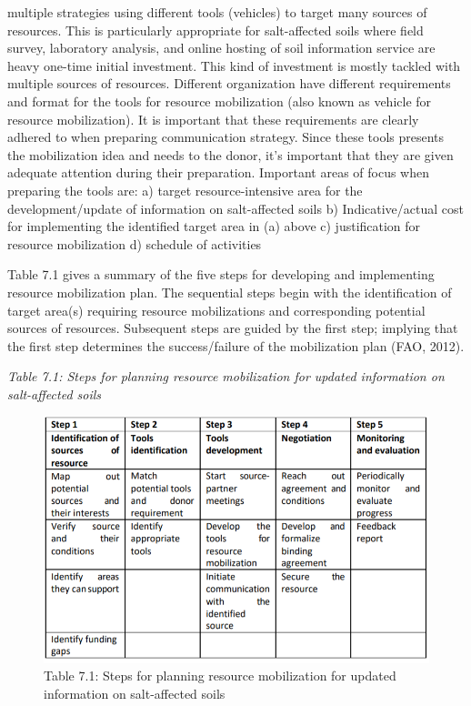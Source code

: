 \documentclass[
  10pt,
  b5paper,
]{book}
\begin{document}
multiple strategies using different tools (vehicles) to target many sources of resources. This is particularly appropriate for salt-affected soils where field survey, laboratory analysis, and online hosting of soil information service are heavy one-time initial investment. This kind of investment is mostly tackled with multiple sources of resources.
Different organization have different requirements and format for the tools for resource mobilization (also known as vehicle for resource mobilization). It is important that these requirements are clearly adhered to when preparing communication strategy. Since these tools presents the mobilization idea and needs to the donor, it's important that they are given adequate attention during their preparation. Important areas of focus when preparing the tools are:
a) target resource-intensive area for the development/update of information on salt-affected soils
b) Indicative/actual cost for implementing the identified target area in (a) above
c) justification for resource mobilization
d) schedule of activities

Table 7.1 gives a summary of the five steps for developing and implementing resource mobilization plan. The sequential steps begin with the identification of target area(s) requiring resource mobilizations and corresponding potential sources of resources. Subsequent steps are guided by the first step; implying that the first step determines the success/failure of the mobilization plan (FAO, 2012).

\emph{Table 7.1: Steps for planning resource mobilization for updated information on salt-affected soils}

\begin{figure}
\centering
\includegraphics{figures/tables/Table_6.2.png}
\caption{Table 7.1: Steps for planning resource mobilization for updated information on salt-affected soils}
\end{figure}
\end{document}

